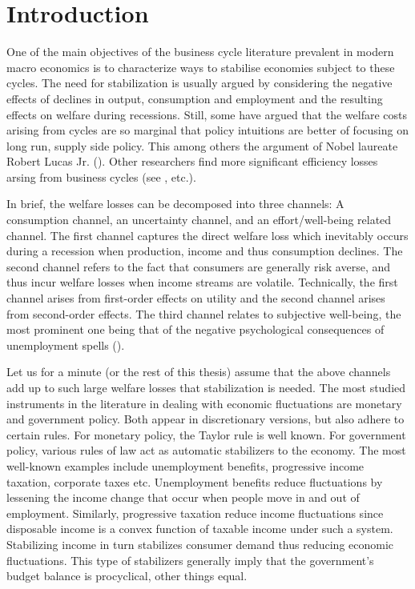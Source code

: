 




\section{Introduction}
\label{chap:intro}

One of the main objectives of the business cycle literature prevalent in modern macro economics is to characterize ways to stabilise economies subject to these cycles. 
The need for stabilization is usually argued by considering the negative effects of declines in output, consumption and employment and the resulting effects on welfare during recessions. Still, some have argued that the welfare costs arising from cycles are so marginal that policy intuitions are better of focusing on long run, supply side policy. This among others the argument of Nobel laureate Robert Lucas Jr. (\citet{lucas2003macroeconomic}). Other researchers find more significant efficiency losses arsing from business cycles (see \citet{gali2007markups}, \citet{tella2003macroeconomics} etc.). 


In brief, the welfare losses can be decomposed into three channels: A consumption channel, an uncertainty channel, and an effort/well-being related channel. The first channel captures the direct welfare loss which inevitably occurs during a recession when production, income and thus consumption declines. The second channel refers to the fact that consumers are generally risk averse, and thus incur welfare losses when income streams are volatile. Technically, the first channel arises from first-order effects on utility and the second channel arises from second-order effects. The third channel relates to subjective well-being, the most prominent one being that of the negative psychological consequences of unemployment spells (\citet{wolfers2003business}).

Let us for a minute (or the rest of this thesis) assume that the above channels add up to such large welfare losses that stabilization is needed. The most studied instruments in the literature in dealing with economic fluctuations are monetary and government policy. Both appear in discretionary versions, but also adhere to certain rules. For monetary policy, the Taylor rule is well known. For government policy, various rules of law act as automatic stabilizers to the economy. The most well-known examples include unemployment benefits, progressive income taxation, corporate taxes etc. Unemployment benefits reduce fluctuations by lessening the income change that occur when people move in and out of employment. Similarly, progressive taxation reduce income fluctuations since disposable income is a convex function of taxable income under such a system.  Stabilizing income in turn stabilizes consumer demand thus reducing economic fluctuations. This type of stabilizers generally imply that the government's budget balance is procyclical, other things equal.   

